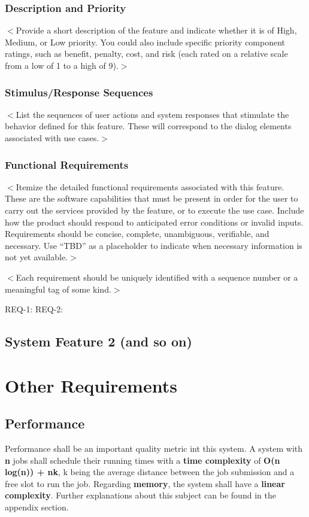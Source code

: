 \documentclass{scrreprt}
\begin{document}
\subsection{Description and Priority}
$<$Provide a short description of the feature and indicate whether it is of 
High, Medium, or Low priority. You could also include specific priority 
component ratings, such as benefit, penalty, cost, and risk (each rated on a 
relative scale from a low of 1 to a high of 9).$>$

\subsection{Stimulus/Response Sequences}
$<$List the sequences of user actions and system responses that stimulate the 
behavior defined for this feature. These will correspond to the dialog elements 
associated with use cases.$>$

\subsection{Functional Requirements}
$<$Itemize the detailed functional requirements associated with this feature.  
These are the software capabilities that must be present in order for the user 
to carry out the services provided by the feature, or to execute the use case.  
Include how the product should respond to anticipated error conditions or 
invalid inputs. Requirements should be concise, complete, unambiguous, 
verifiable, and necessary. Use “TBD” as a placeholder to indicate when necessary 
information is not yet available.$>$

$<$Each requirement should be uniquely identified with a sequence number or a 
meaningful tag of some kind.$>$

REQ-1:	REQ-2:

\section{System Feature 2 (and so on)}


\chapter{Other Requirements}

\section{Performance}

Performance shall be an important quality metric int this system. A system with \textbf{n} jobs shall schedule their running times with a \textbf{time complexity} of \textbf{O(n log(n)) + nk}, k being the average distance between the job submission and a free slot to run the job. Regarding \textbf{memory}, the system shall have a \textbf{linear complexity}. Further explanations about this subject can be found in the appendix section.
\end{document}
